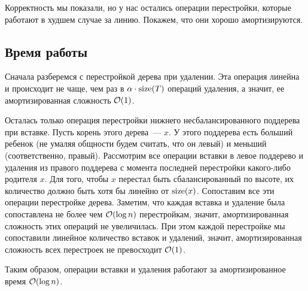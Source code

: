 Корректность мы показали, но у нас остались операции перестройки, которые работают в худшем случае за линию. Покажем, что они хорошо амортизируются.

\subsection{Время работы}

Сначала разберемся с перестройкой дерева при удалении. Эта операция линейна и происходит не чаще, чем раз в $\alpha \cdot \operatorname{size}(T)$ операций удаления, а значит, ее амортизированная сложность $\mathcal{O}(1)$.

Осталась только операция перестройки нижнего несбалансированного поддерева при вставке. Пусть корень этого дерева~--- $x$. У этого поддерева есть больший ребенок (не умаляя общности будем считать, что он левый) и меньший (соответственно, правый). Рассмотрим все операции вставки в левое поддерево и удаления из правого поддерева с момента последней перестройки какого-либо родителя $x$. Для того, чтобы $x$ перестал быть сбалансированный по высоте, их количество должно быть хотя бы линейно от $\operatorname{size}(x)$. Сопоставим все эти операции перестройке дерева. Заметим, что каждая вставка и удаление была сопоставлена не более чем $\mathcal{O}(\log n)$ перестройкам, значит, амортизированная сложность этих операций не увеличилась. При этом каждой перестройке мы сопоставили линейное количество вставок и удалений, значит, амортизированная сложность всех перестроек не превосходит $\mathcal{O}(1)$.

Таким образом, операции вставки и удаления работают за амортизированное время $\mathcal{O}(\log n)$.
